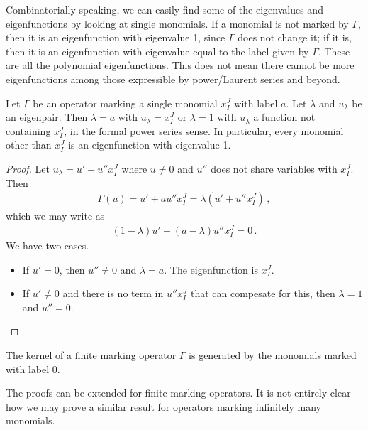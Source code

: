 Combinatorially speaking, we can easily find some of the eigenvalues and eigenfunctions by looking at single monomials. If a monomial is not marked by $\Gamma$, then it is an eigenfunction with eigenvalue 1, since $\Gamma$ does not change it; if it is, then it is an eigenfunction with eigenvalue equal to the label given by $\Gamma$. These are all the polynomial eigenfunctions. This does not mean there cannot be more eigenfunctions among those expressible by power/Laurent series and beyond.
\begin{prop} Let $\Gamma$ be an operator marking a single monomial $x_I^J$ with label $a$. Let $\lambda$ and $u_\lambda$ be an eigenpair. Then $\lambda = a$ with $u_\lambda = x_I^J$ or $\lambda = 1$ with $u_\lambda$ a function not containing $x_I^J$, in the formal power series sense. In particular, every monomial other than $x_I^J$ is an eigenfunction with eigenvalue 1.
\end{prop}
\begin{proof}
Let $u_\lambda = u' + u''x_I^J$ where $u \neq 0$ and $u''$ does not share variables with $x_I^J$. Then
\begin{align}
	\Gamma(u) = u' + au''x_I^J  = \lambda (u' + u''x_I^J)\,,
\end{align}
which we may write as
\begin{align}
	(1-\lambda) u' + (a-\lambda)u''x_I^J  = 0\,.
\end{align}
We have two cases.
\begin{itemize}
\item If $u' = 0$, then $u'' \neq 0$ and $\lambda = a$. The eigenfunction is $x_I^J$.
\item If $u' \neq 0$ and there is no term in $u''x_I^J$ that can compesate for this, then $\lambda = 1$ and $u'' = 0$.
\end{itemize}
\end{proof}

\begin{corollary} The kernel of a finite marking operator $\Gamma$ is generated by the monomials marked with label 0.
\end{corollary}

The proofs can be extended for finite marking operators. It is not entirely clear how we may prove a similar result for operators marking infinitely many monomials.

